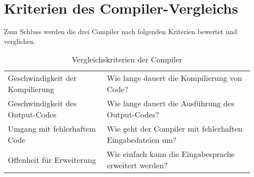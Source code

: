 \section{Kriterien des Compiler-Vergleichs}
Zum Schluss werden die drei Compiler nach folgenden Kriterien bewertet und verglichen.

\begin{table}[H]
    \centering
    \caption{Vergleichskriterien der Compiler}
    \vspace{3mm} %

    \begin{tabular}{l|l}
    Geschwindigkeit der Kompilierung    & Wie lange dauert die Kompilierung von Code?                       \\
    Geschwindigkeit des Output-Codes    & Wie lange dauert die Ausführung des Output-Codes?                 \\
    Umgang mit fehlerhaftem Code        & Wie geht der Compiler mit fehlerhaften Eingabedateien um?         \\
    Offenheit für Erweiterung           & Wie einfach kann die Eingabesprache erweitert werden?                                 
    \end{tabular}
\end{table}

